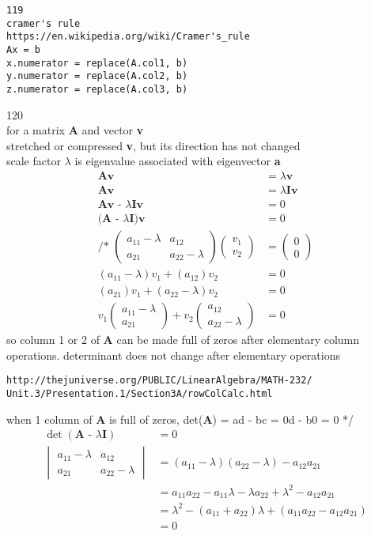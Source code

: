 \documentclass[12pt,border=4pt,multi]{article} %
\begin{document}
\begin{verbatim}
119
cramer's rule
https://en.wikipedia.org/wiki/Cramer's_rule
Ax = b
x.numerator = replace(A.col1, b)
y.numerator = replace(A.col2, b)
z.numerator = replace(A.col3, b)
\end{verbatim}
120\\
for a matrix \textbf{A} and vector \textbf{v}\\
stretched or compressed \textbf{v}, but its direction has not changed\\
scale factor $\lambda$ is eigenvalue associated with eigenvector \textbf{a}
\begin{align*}
\textbf{Av} &= \lambda\textbf{v}\\
\textbf{Av} &= \lambda\textbf{Iv}\\
\textbf{Av - $\lambda$Iv} &= 0\\
\textbf{(A - $\lambda$I)v} &= 0\\
\text{/* }
\begin{pmatrix}
a_{11} - \lambda & a_{12}\\
a_{21} & a_{22} - \lambda
\end{pmatrix}
\begin{pmatrix}
v_1\\
v_2
\end{pmatrix} &=
\begin{pmatrix}
0\\
0
\end{pmatrix}\\
(a_{11} - \lambda)v_1 + (a_{12})v_2 &= 0\\
(a_{21})v_1 + (a_{22} - \lambda)v_2 &= 0\\
v_1 
\begin{pmatrix}
a_{11} - \lambda\\
a_{21}
\end{pmatrix}
+
v_2
\begin{pmatrix}
a_{12}\\
a_{22} - \lambda
\end{pmatrix}
&= 0 
\end{align*}
so column 1 or 2 of \textbf{A} can be made full of zeros after elementary column operations. determinant does not change after elementary operations
\begin{verbatim}
http://thejuniverse.org/PUBLIC/LinearAlgebra/MATH-232/
Unit.3/Presentation.1/Section3A/rowColCalc.html
\end{verbatim}
when 1 column of \textbf{A} is full of zeros, det(\textbf{A}) = ad - bc = 0d - b0 = 0 */
\begin{align*}
\det(\textbf{A - $\lambda$I}) &= 0\\
\begin{vmatrix}
a_{11} - \lambda & a_{12}\\
a_{21} & a_{22} - \lambda
\end{vmatrix} 
&= (a_{11} - \lambda)(a_{22} - \lambda) - a_{12} a_{21}\\
&= a_{11} a_{22} - a_{11} \lambda - \lambda a_{22} + \lambda^2 - a_{12} a_{21}\\
&= \lambda^2 - (a_{11} + a_{22})\lambda + (a_{11} a_{22} - a_{12} a_{21})\\ 
&= 0\\
\end{align*}
\end{document}
